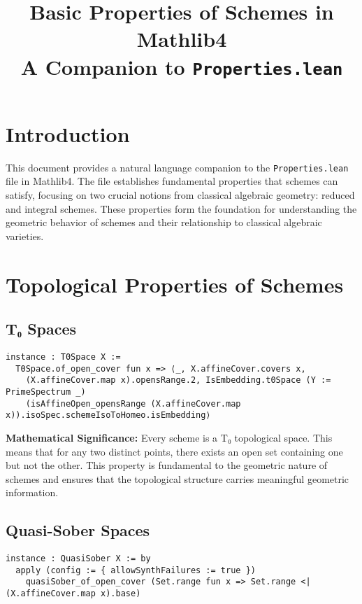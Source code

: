 \documentclass{article}
\title{Basic Properties of Schemes in Mathlib4\\
\large A Companion to \texttt{Properties.lean}}
\author{}
\date{}
\theoremstyle{definition}
\begin{document}
\maketitle

\section{Introduction}

This document provides a natural language companion to the \texttt{Properties.lean} file in Mathlib4. The file establishes fundamental properties that schemes can satisfy, focusing on two crucial notions from classical algebraic geometry: reduced and integral schemes. These properties form the foundation for understanding the geometric behavior of schemes and their relationship to classical algebraic varieties.

\section{Topological Properties of Schemes}

\subsection{T₀ Spaces}

\begin{lstlisting}
instance : T0Space X :=
  T0Space.of_open_cover fun x => ⟨_, X.affineCover.covers x,
    (X.affineCover.map x).opensRange.2, IsEmbedding.t0Space (Y := PrimeSpectrum _)
    (isAffineOpen_opensRange (X.affineCover.map x)).isoSpec.schemeIsoToHomeo.isEmbedding⟩
\end{lstlisting}

\textbf{Mathematical Significance:} Every scheme is a T₀ topological space. This means that for any two distinct points, there exists an open set containing one but not the other. This property is fundamental to the geometric nature of schemes and ensures that the topological structure carries meaningful geometric information.

\subsection{Quasi-Sober Spaces}

\begin{lstlisting}
instance : QuasiSober X := by
  apply (config := { allowSynthFailures := true })
    quasiSober_of_open_cover (Set.range fun x => Set.range <| (X.affineCover.map x).base)
\end{lstlisting}
\end{document}
